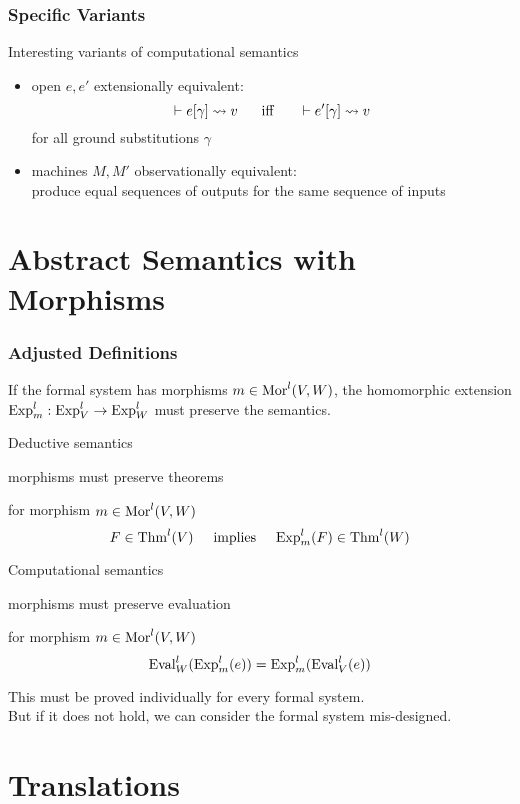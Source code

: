 \begin{frame}\frametitle{Specific Variants}
Interesting variants of computational semantics
\begin{itemize}
\item open $e,e'$ extensionally equivalent:
  \[\vdash e[\gamma]\rightsquigarrow v \hspace*{.5cm}\;\mathrm{iff}\;\hspace*{.5cm} \vdash e'[\gamma]\rightsquigarrow v\]
  for all ground substitutions $\gamma$
\item machines $M,M'$ observationally equivalent: \\
  produce equal sequences of outputs for the same sequence of inputs
\end{itemize}

\end{frame}


\section{Abstract Semantics with Morphisms}

\begin{frame}\frametitle{Adjusted Definitions}
If the formal system has morphisms $m\in\mathrm{Mor}^l(V,W)$, the homomorphic extension $\mathrm{Exp}^l_m:\mathrm{Exp}^l_V\to\mathrm{Exp}^l_W$ must preserve the semantics.

\begin{blockitems}{Deductive semantics}
\item morphisms must preserve theorems
\item for morphism $m\in\mathrm{Mor}^l(V,W)$
   \[F\in \mathrm{Thm}^l(V)\hspace*{.5cm}\text{implies}\hspace*{.5cm} \mathrm{Exp}^l_m(F)\in \mathrm{Thm}^l(W)\]
\end{blockitems}

\begin{blockitems}{Computational semantics}
\item morphisms must preserve evaluation
\item for morphism $m\in\mathrm{Mor}^l(V,W)$
 \[\mathrm{Eval}^l_W(\mathrm{Exp}^l_m(e))=\mathrm{Exp}^l_m(\mathrm{Eval}^l_V(e))\]
\end{blockitems}
This must be proved individually for every formal system.\\
But if it does not hold, we can consider the formal system mis-designed.
\end{frame}


\section{Translations}

